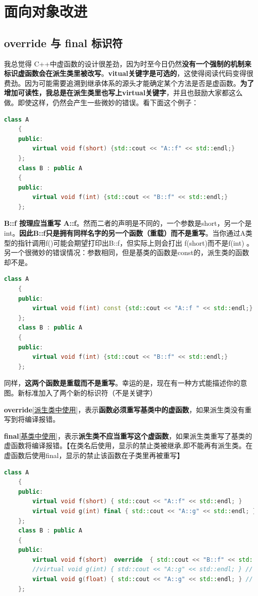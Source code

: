 \documentclass[UTF8,a4paper,12pt]{ctexbook} %
\begin{document}
	\section{面向对象改进}
		\subsection{override 与 final 标识符}
			我总觉得 C++中虚函数的设计很差劲，因为时至今日仍然\textbf{没有一个强制的机制来标识虚函数会在派生类里被改写}。\textbf{vitual关键字是可选的}，这使得阅读代码变得很费劲。因为可能需要追溯到继承体系的源头才能确定某个方法是否是虚函数。\textbf{为了增加可读性，我总是在派生类里也写上virtual关键字}，并且也鼓励大家都这么做。即使这样，仍然会产生一些微妙的错误。看下面这个例子：
			\begin{lstlisting}[language=C++]
	class A 
	{
	public:
		virtual void f(short) {std::cout << "A::f" << std::endl;}
	};
	class B : public A
	{
	public:
		virtual void f(int) {std::cout << "B::f" << std::endl;}
	};			
			\end{lstlisting}
			
			\textbf{B::f 按理应当重写 A::f}。然而二者的声明是不同的，一个参数是short，另一个是int。\textbf{因此B::f只是拥有同样名字的另一个函数（重载）而不是重写}。当你通过A类型的指针调用f()可能会期望打印出B::f，但实际上则会打出 f(short)而不是f(int) 。另一个很微妙的错误情况：参数相同，但是基类的函数是const的，派生类的函数却不是。
			\begin{lstlisting}[language= C++]
	class A 
	{
	public:
		virtual void f(int) const {std::cout << "A::f " << std::endl;}
	};
	class B : public A
	{
	public:
		virtual void f(int) {std::cout << "B::f" << std::endl;}
	};			
			\end{lstlisting}
			
			
			同样，\textbf{这两个函数是重载而不是重写}。幸运的是，现在有一种方式能描述你的意图。新标准加入了两个新的标识符（不是关键字）
			
			\textbf{override}[\underline{派生类中使用}]，表示\textbf{函数必须重写基类中的虚函数}，如果派生类没有重写到将编译报错。
			
			\textbf{final}[\underline{基类中使用}]，表示\textbf{派生类不应当重写这个虚函数}，如果派生类重写了基类的虚函数将编译报错。【在类名后使用，显示的禁止类被继承,即不能再有派生类。在虚函数后使用final，显示的禁止该函数在子类里再被重写】
			
			\begin{lstlisting}[language=C++]
	class A
	{
	public:
		virtual void f(short) { std::cout << "A::f" << std::endl; }
		virtual void g(int) final { std::cout << "A::g" << std::endl; }
	};
	class B : public A
	{
	public:
		virtual void f(short)  override  { std::cout << "B::f" << std::endl; }
		//virtual void g(int) { std::cout << "A::g" << std::endl; } // error C3248: "main::A::g":  final'func can not be "main::B::g" Rewrite: Wu fa Bei ChongXie
		virtual void g(float) { std::cout << "A::g" << std::endl; } // ChongZai
	};			
			\end{lstlisting}
\end{document}
